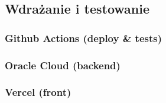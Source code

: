 \subsection{Wdrażanie i testowanie}

\subsubsection{Github Actions (deploy \& tests)}


\subsubsection{Oracle Cloud (backend)}

\subsubsection{Vercel (front)}

